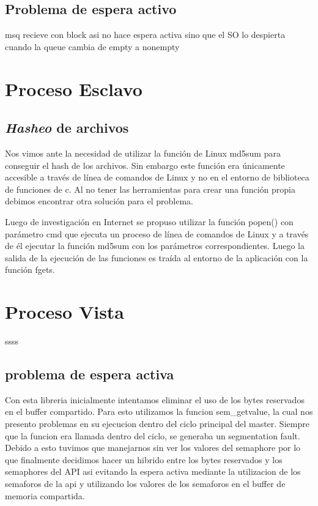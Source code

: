 \documentclass[10pt,a4paper]{report}
\begin{document}
\subsection{Problema de espera activo}
msq recieve con block asi no hace espera activa sino que el SO lo despierta cuando la queue cambia de empty a nonempty
\section{Proceso Esclavo}
\subsection{\textit{Hasheo} de archivos}
Nos vimos ante la necesidad de utilizar la función de Linux md5sum para conseguir el hash de los archivos. Sin embargo este función
era únicamente accesible a través de línea de comandos de Linux y no en el entorno de biblioteca de funciones de c. Al no tener las
herramientas para crear una función propia debimos encontrar otra solución para el problema.

Luego de investigación en Internet se propuso utilizar la función popen() con parámetro cmd que ejecuta un proceso de línea de comandos
de Linux y a través de él ejecutar la función md5sum con los parámetros correspondientes. Luego la salida de la ejecución de las funciones
es traída al entorno de la aplicación con la función fgets.
\section{Proceso Vista}
ssss
\subsection{problema de espera activa}
	Con esta libreria inicialmente intentamos eliminar el uso de los bytes reservados en el buffer compartido. Para esto utilizamos la funcion sem\_getvalue, la cual nos presento problemas en su ejecucion dentro del ciclo principal del master. Siempre que la funcion era llamada dentro del ciclo, se generaba un segmentation fault. Debido a esto tuvimos que manejarnos sin ver los valores del semaphore por lo que finalmente decidimos hacer un hibrido entre los bytes reservados y los semaphores del API asi evitando la espera activa mediante la utilizacion de los semaforos de la api y utilizando los valores de los semaforos en el buffer de memoria compartida.

\end{document}
